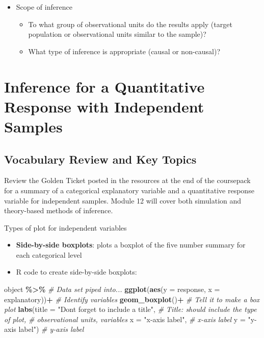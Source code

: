 \documentclass[
]{report}
\newenvironment{Shaded}{\begin{snugshade}}{\end{snugshade}}
\newcommand{\AttributeTok}[1]{\textcolor[rgb]{0.13,0.29,0.53}{#1}}
\newcommand{\CommentTok}[1]{\textcolor[rgb]{0.56,0.35,0.01}{\textit{#1}}}
\newcommand{\FunctionTok}[1]{\textcolor[rgb]{0.13,0.29,0.53}{\textbf{#1}}}
\newcommand{\NormalTok}[1]{#1}
\newcommand{\SpecialCharTok}[1]{\textcolor[rgb]{0.81,0.36,0.00}{\textbf{#1}}}
\newcommand{\StringTok}[1]{\textcolor[rgb]{0.31,0.60,0.02}{#1}}
\begin{document}
\newpage

\begin{itemize}
\item
  Scope of inference

  \begin{itemize}
  \item
    To what group of observational units do the results apply (target population or observational units similar to the sample)?
  \item
    What type of inference is appropriate (causal or non-causal)?
  \end{itemize}
\end{itemize}

\newpage

\chapter{Inference for a Quantitative Response with Independent Samples}\label{inference-for-a-quantitative-response-with-independent-samples}

\section{Vocabulary Review and Key Topics}\label{vocabulary-review-and-key-topics-9}

Review the Golden Ticket posted in the resources at the end of the coursepack for a summary of a categorical explanatory variable and a quantitative response variable for independent samples. Module 12 will cover both simulation and theory-based methods of inference.

Types of plot for independent variables

\begin{itemize}
\item
  \textbf{Side-by-side boxplots}: plots a boxplot of the five number summary for each categorical level
\item
  R code to create side-by-side boxplots:
\end{itemize}

\begin{Shaded}
\begin{Highlighting}[]
\NormalTok{object }\SpecialCharTok{\%\textgreater{}\%}  \CommentTok{\# Data set piped into...}
  \FunctionTok{ggplot}\NormalTok{(}\FunctionTok{aes}\NormalTok{(}\AttributeTok{y =}\NormalTok{ response, }\AttributeTok{x =}\NormalTok{ explanatory))}\SpecialCharTok{+}  \CommentTok{\# Identify variables}
  \FunctionTok{geom\_boxplot}\NormalTok{()}\SpecialCharTok{+}  \CommentTok{\# Tell it to make a box plot}
  \FunctionTok{labs}\NormalTok{(}\AttributeTok{title =} \StringTok{"Don\textquotesingle{}t forget to include a title"}\NormalTok{,  }\CommentTok{\# Title: should include the type of plot,}
       \CommentTok{\# observational units, variables}
       \AttributeTok{x =} \StringTok{"x{-}axis label"}\NormalTok{,    }\CommentTok{\# x{-}axis label}
       \AttributeTok{y =} \StringTok{"y{-}axis label"}\NormalTok{)  }\CommentTok{\# y{-}axis label}
\end{Highlighting}
\end{Shaded}
\end{document}
